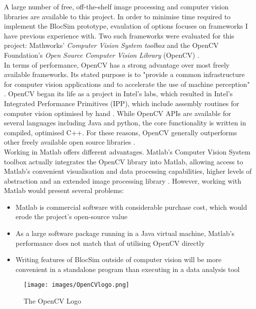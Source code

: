 A large number of free, off-the-shelf image processing and computer vision libraries are available to this project. In order to minimise time required to implement the BlocSim prototype, evaulation of options focuses on frameworks I have previous experience with. Two such frameworks were evaluated for this project: Mathworks' \textit{Computer Vision System toolbox} \cite{matlab} and the OpenCV Foundation's \textit{Open Source Computer Vision Library} (OpenCV) \cite{opencv}.
\\

In terms of performance, OpenCV has a strong advantage over most freely available frameworks.
Its stated purpose is to "provide a common infrastructure for computer vision applications and to accelerate the use of machine perception" \cite{opencv}. OpenCV began its life as a project in Intel's labs, which resulted in Intel's Integrated Performance Primitives (IPP), which include assembly routines for computer vision optimised by hand \cite{opencvBook}. While OpenCV APIs are available for several languages including Java and python, the core functionality is written in compiled, optimised C++. For these reasons, OpenCV generally outperforms other freely available open source libraries \cite{opencvBench}.
\\

Working in Matlab offers different advantages. Matlab's Computer Vision System toolbox actually integrates the OpenCV library into Matlab, allowing access to Matlab's convenient visualisation and data processing capabilities, higher levels of abstraction and an extended image processing library \cite{matlabCV}. However, working with Matlab would present several problems:

\begin{itemize}
\item Matlab is commercial software with considerable purchase cost, which would erode the project's open-source value
\item As a large software package running in a Java virtual machine, Matlab's performance does not match that of utilising OpenCV directly
\item Writing features of BlocSim outside of computer vision will be more convenient in a standalone program than executing in a data analysis tool
\end{itemize}

\begin{figure}[ht!]
\centering
\texttt{[image: images/OpenCVlogo.png]}
\caption{The OpenCV Logo \cite{opencv}}
\label{im:cvlogo}
\end{figure}

